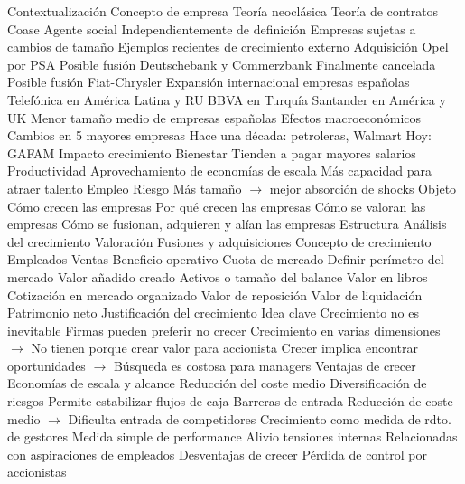\documentclass{nuevotema}
\begin{document}
\begin{esquemal}
	\1[] 
		\2 Contextualización
			\3 Concepto de empresa
				\4 Teoría neoclásica
				\4 Teoría de contratos
				\4[] Coase
				\4 Agente social
				\4 Independientemente de definición
				\4[] Empresas sujetas a cambios de tamaño
			\3 Ejemplos recientes de crecimiento externo
				\4 Adquisición Opel por PSA
				\4 Posible fusión Deutschebank y Commerzbank
				\4[] Finalmente cancelada
				\4 Posible fusión Fiat-Chrysler
				\4 Expansión internacional empresas españolas
				\4[] Telefónica en América Latina y RU
				\4[] BBVA en Turquía
				\4[] Santander en América y UK
				\4 Menor tamaño medio de empresas españolas
				\4[] Efectos macroeconómicos
				\4 Cambios en 5 mayores empresas
				\4[] Hace una década: petroleras, Walmart
				\4[] Hoy: GAFAM
			\3 Impacto crecimiento
				\4 Bienestar
				\4[] Tienden a pagar mayores salarios
				\4 Productividad
				\4[] Aprovechamiento de economías de escala
				\4[] Más capacidad para atraer talento
				\4 Empleo
				\4 Riesgo
				\4[] Más tamaño $\to$ mejor absorción de shocks
		\2 Objeto
			\3 Cómo crecen las empresas
			\3 Por qué crecen las empresas
			\3 Cómo se valoran las empresas
			\3 Cómo se fusionan, adquieren y alían las empresas
		\2 Estructura
			\3 Análisis del crecimiento
			\3 Valoración
			\3 Fusiones y adquisiciones
	\1
		\2 Concepto de crecimiento
			\3 Empleados
			\3 Ventas
			\3 Beneficio operativo
			\3 Cuota de mercado
				\4 Definir perímetro del mercado
			\3 Valor añadido creado
			\3 Activos o tamaño del balance
				\4 Valor en libros
				\4 Cotización en mercado organizado
				\4 Valor de reposición
				\4 Valor de liquidación
			\3 Patrimonio neto
		\2 Justificación del crecimiento
			\3 Idea clave
				\4 Crecimiento no es inevitable
				\4[] Firmas pueden preferir no crecer
				\4[] Crecimiento en varias dimensiones
				\4[] $\to$ No tienen porque crear valor para accionista
				\4 Crecer implica encontrar oportunidades
				\4[] $\to$ Búsqueda es costosa para managers
			\3 Ventajas de crecer
				\4 Economías de escala y alcance
				\4[] Reducción del coste medio
				\4 Diversificación de riesgos
				\4[] Permite estabilizar flujos de caja
				\4 Barreras de entrada
				\4[] Reducción de coste medio
				\4[] $\to$ Dificulta entrada de competidores
				\4 Crecimiento como medida de rdto. de gestores
				\4[] Medida simple de performance
				\4 Alivio tensiones internas
				\4[] Relacionadas con aspiraciones de empleados
			\3 Desventajas de crecer
				\4 Pérdida de control por accionistas

\end{esquemal}
\end{document}
